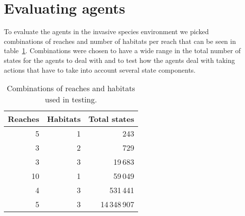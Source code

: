 \section{Evaluating agents }
\label{sec:eval_agents}

To evaluate the agents in the invasive species environment we picked combinations of reaches and number of habitats per reach that can be seen in table~\ref{tab:reaches_habitats}. Combinations were chosen to have a wide range in the total number of states for the agents to deal with and to test how the agents deal with taking actions that have to take into account several state components.

\begin{table}[H]
\centering
\caption{Combinations of reaches and habitats used in testing.}
\label{tab:reaches_habitats}
\begin{tabular}{rrr}
 \toprule
 Reaches & Habitats & Total states \\
 \midrule
 5  & 1 &          243 \\
 3  & 2 &          729 \\
 3  & 3 &      19\,683 \\
 10 & 1 &      59\,049 \\
 4  & 3 &     531\,441 \\
 5  & 3 & 14\,348\,907 \\
 \bottomrule
\end{tabular}
\end{table}